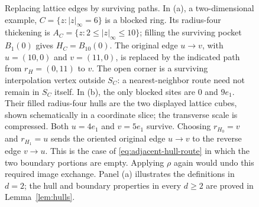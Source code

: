 \begin{figure}[tbp]
\caption{Replacing lattice edges by surviving paths.
In (a), a two-dimensional example, $C=\{z:|z|_\infty=6\}$ is a blocked
ring.  Its radius-four thickening is
$A_C=\{z:2\le|z|_\infty\le10\}$; filling the surviving pocket
$B_1(0)$ gives $H_C=B_{10}(0)$.  The original edge $u\to v$, with
$u=(10,0)$ and $v=(11,0)$, is replaced by the indicated path from
$r_H=(0,11)$ to $v$.  The open corner is a surviving interpolation
vertex outside $S_C$: a nearest-neighbor route need not remain in $S_C$
itself.  In (b), the only blocked sites are $0$ and $9e_1$.
Their filled radius-four hulls are the two
displayed lattice cubes, shown schematically in a coordinate slice; the
transverse scale is compressed.  Both $u=4e_1$ and $v=5e_1$ survive.
Choosing $r_{H_0}=v$ and $r_{H_1}=u$ sends the oriented original edge
$u\to v$ to the reverse edge $v\to u$.  This is the case of
\eqref{eq:adjacent-hull-route} in which the two boundary portions are
empty.  Applying $\rho$ again would undo this required image exchange.
Panel (a) illustrates the definitions in $d=2$; the hull and boundary
properties in every $d\ge2$ are proved in Lemma~\ref{lem:hulls}.}
\label{fig:hull-routing}
\end{figure}
